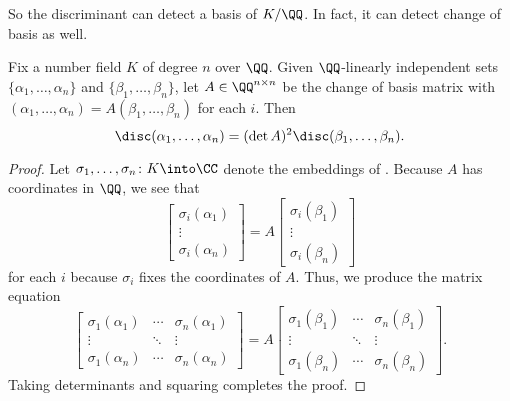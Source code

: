 \documentclass[../notes.tex]{subfiles}
\begin{document}
So the discriminant can detect a basis of $K/\QQ$. In fact, it can detect change of basis as well.
\begin{lemma} \label{lem:disc-change-of-basis}
	Fix a number field $K$ of degree $n$ over $\QQ$. Given $\QQ$-linearly independent sets $\{\alpha_1,\ldots,\alpha_n\}$ and $\{\beta_1,\ldots,\beta_n\}$, let $A\in\QQ^{n\times n}$ be the change of basis matrix with $(\alpha_1,\ldots,\alpha_n)=A(\beta_1,\ldots,\beta_n)$ for each $i$. Then
	\[\disc(\alpha_1,\ldots,\alpha_n)=(\det A)^2\disc(\beta_1,\ldots,\beta_n).\] 
\end{lemma}
\begin{proof}
	Let $\sigma_1,\ldots,\sigma_n\colon K\into\CC$ denote the embeddings of . Because $A$ has coordinates in $\QQ$, we see that
	\[\begin{bmatrix}
		\sigma_i(\alpha_1) \\
		\vdots \\
		\sigma_i(\alpha_n)
	\end{bmatrix}=A\begin{bmatrix}
		\sigma_i(\beta_1) \\
		\vdots \\
		\sigma_i(\beta_n)
	\end{bmatrix}\]
	for each $i$ because $\sigma_i$ fixes the coordinates of $A$. Thus, we produce the matrix equation
	\[\begin{bmatrix}
		\sigma_1(\alpha_1) & \cdots & \sigma_n(\alpha_1) \\
		\vdots & \ddots & \vdots \\
		\sigma_1(\alpha_n) & \cdots & \sigma_n(\alpha_n)
	\end{bmatrix}=A\begin{bmatrix}
		\sigma_1(\beta_1) & \cdots & \sigma_n(\beta_1) \\
		\vdots & \ddots & \vdots \\
		\sigma_1(\beta_n) & \cdots & \sigma_n(\beta_n)
	\end{bmatrix}.\]
	Taking determinants and squaring completes the proof.
\end{proof}
\end{document}
